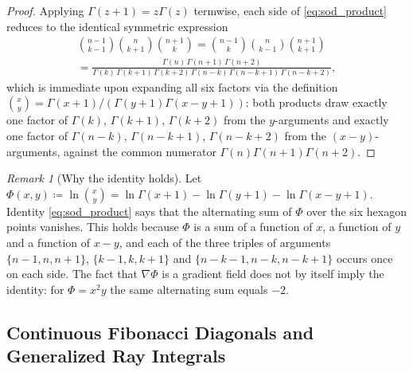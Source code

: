 \documentclass[11pt,a4paper]{article}
\theoremstyle{plain}
\theoremstyle{definition}
\theoremstyle{remark}
\newtheorem{remark}[theorem]{Remark}
\numberwithin{equation}{section}
\begin{document}
\begin{proof}
Applying $\Gamma(z+1) = z\Gamma(z)$ termwise, each side of \eqref{eq:sod_product} reduces to the identical symmetric expression
\begin{multline}
\binom{n-1}{k-1}\binom{n}{k+1}\binom{n+1}{k} = \binom{n-1}{k}\binom{n}{k-1}\binom{n+1}{k+1} \\ = \frac{\Gamma(n)\,\Gamma(n+1)\,\Gamma(n+2)}{\Gamma(k)\,\Gamma(k+1)\,\Gamma(k+2)\,\Gamma(n-k)\,\Gamma(n-k+1)\,\Gamma(n-k+2)},
\end{multline}
which is immediate upon expanding all six factors via the definition $\binom{x}{y}=\Gamma(x+1)/(\Gamma(y+1)\Gamma(x-y+1))$: both products draw exactly one factor of $\Gamma(k)$, $\Gamma(k+1)$, $\Gamma(k+2)$ from the $y$-arguments and exactly one factor of $\Gamma(n-k)$, $\Gamma(n-k+1)$, $\Gamma(n-k+2)$ from the $(x-y)$-arguments, against the common numerator $\Gamma(n)\Gamma(n+1)\Gamma(n+2)$.
\end{proof}

\begin{remark}[Why the identity holds]
Let $\Phi(x,y) \coloneqq \ln\binom{x}{y} = \ln\Gamma(x+1) - \ln\Gamma(y+1) - \ln\Gamma(x-y+1)$. Identity \eqref{eq:sod_product} says that the alternating sum of $\Phi$ over the six hexagon points vanishes. This holds because $\Phi$ is a sum of a function of $x$, a function of $y$ and a function of $x - y$, and each of the three triples of arguments $\{n-1, n, n+1\}$, $\{k-1, k, k+1\}$ and $\{n-k-1, n-k, n-k+1\}$ occurs once on each side. The fact that $\nabla\Phi$ is a gradient field does not by itself imply the identity: for $\Phi = x^2 y$ the same alternating sum equals $-2$.
\end{remark}

\subsection{Continuous Fibonacci Diagonals and Generalized Ray Integrals}
\end{document}
